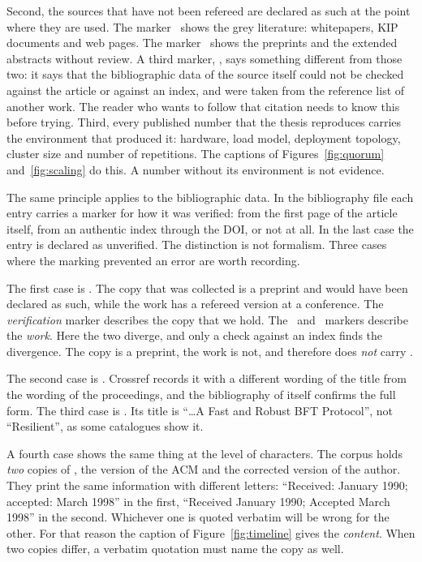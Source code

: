 Second, the sources that have not been refereed are declared as such at
the point where they are used. The marker \grey\ shows the grey
literature: whitepapers, KIP documents and web pages. The marker \prep\
shows the preprints and the extended abstracts without review. A third
marker, \unver, says something different from those two: it says that the
bibliographic data of the source itself could not be checked against the
article or against an index, and were taken from the reference list of
another work. The reader who wants to follow that citation needs to know
this before trying. Third,
every published number that the thesis reproduces carries the environment
that produced it: hardware, load model, deployment topology, cluster size
and number of repetitions. The captions of Figures~\ref{fig:quorum}
and~\ref{fig:scaling} do this. A number without its environment is not
evidence.

The same principle applies to the bibliographic data. In the bibliography
file each entry carries a marker for how it was verified: from the first
page of the article itself, from an authentic index through the DOI, or
not at all. In the last case the entry is declared as unverified. The
distinction is not formalism. Three cases where the marking prevented an
error are worth recording.

The first case is \cite{berger2023simulation}. The copy that was
collected is a preprint and would have been declared as such, while the
work has a refereed version at a conference. The \emph{verification}
marker describes the copy that we hold. The \prep\ and \grey\ markers
describe the \emph{work}. Here the two diverge, and only a check against
an index finds the divergence. The copy is a preprint, the work is not,
and therefore \cite{berger2023simulation} does \emph{not} carry \prep.

The second case is \cite{oki1988viewstamped}. Crossref records it with a
different wording of the title from the wording of the proceedings, and
the bibliography of \cite{lamport1998parttime} itself confirms the full
form. The third case is \cite{jalalzai2023fasthotstuff}. Its title is
\enquote{\dots A Fast and Robust BFT Protocol}, not \enquote{Resilient},
as some catalogues show it.

A fourth case shows the same thing at the level of characters. The corpus
holds \emph{two} copies of \cite{lamport1998parttime}, the version of the
ACM and the corrected version of the author. They print the same
information with different letters: \enquote{Received: January 1990;
accepted: March 1998} in the first, \enquote{Received January 1990;
Accepted March 1998} in the second. Whichever one is quoted verbatim will
be wrong for the other. For that reason the caption of
Figure~\ref{fig:timeline} gives the \emph{content}. When two copies
differ, a verbatim quotation must name the copy as well.
